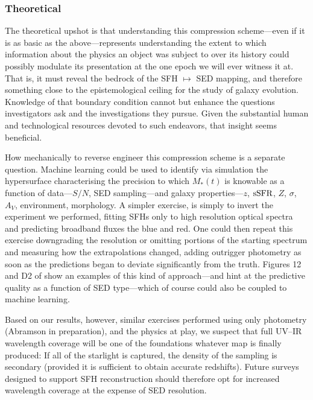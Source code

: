 \documentclass[a4paper,fleqn,usenatbib]{mnras}
\newcommand{\Mstel}{M_\ast}
\newcommand{\ssfr}{{\rm sSFR}}
\begin{document}
\subsubsection{Theoretical}

The theoretical upshot is that understanding this compression scheme---even if it is as basic 
as the above---represents understanding the extent to which information about the
physics an object was subject to over its history could possibly modulate its presentation at the one epoch we 
will ever witness it at. That is, it must reveal the bedrock of the SFH $\mapsto$ SED mapping, and 
therefore something close to the epistemological ceiling for the study of galaxy evolution. Knowledge 
of that boundary condition cannot but enhance the questions investigators ask and the investigations 
they pursue. Given the substantial human and technological resources devoted to such endeavors, 
that insight seems beneficial.

How mechanically to reverse engineer this compression scheme is a separate question. Machine learning 
could be used to identify via simulation the hypersurface characterising the precision to which 
$\Mstel(t)$ is knowable as a function of data---$S/N$, SED sampling---and galaxy 
properties---$z$, $\ssfr$, $Z$, $\sigma$, $A_{V}$, environment, morphology. A simpler exercise,
is simply to invert the experiment we performed, fitting SFHs only to high resolution optical 
spectra and predicting broadband fluxes the blue and red. One could then repeat this exercise 
downgrading the resolution or omitting portions of the starting spectrum and measuring how 
the extrapolations changed, adding outrigger photometry as soon as the predictions began to deviate
significantly from the truth. Figures 12 and D2 of \citet{Abramson20} show an examples of this kind of 
approach---and hint at the predictive quality as a function of SED type---which of 
course could also be coupled to machine learning.


Based on our results, however, similar exercises performed using only photometry 
(Abramson in preparation), and the physics at play, we suspect that full UV--IR 
wavelength coverage will be one of the foundations whatever map is finally produced: If all of 
the starlight is captured, the density of the sampling is secondary (provided it is sufficient
to obtain accurate redshifts). Future surveys designed to support SFH reconstruction should 
therefore opt for increased wavelength coverage at the expense of SED resolution. 
\end{document}
